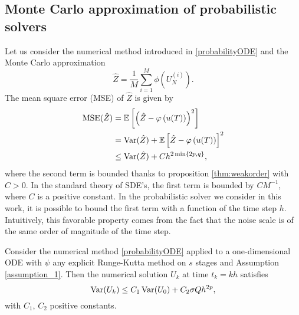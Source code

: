 \subsection{Monte Carlo approximation of probabilistic solvers}
Let us consider the numerical method introduced in \eqref{probabilityODE} and the Monte Carlo approximation 
\begin{equation}\label{eq:MCapproximation}
	\hat Z = \frac{1}{M} \sum_{i = 1}^M \phi\left(U_N^{(i)}\right).
\end{equation}
The mean square error (MSE) of $\hat Z$ is given by
\begin{equation}\label{eq:MCMSE}
\begin{aligned}
\operatorname{MSE}(\hat Z) &= \mathbb{E}\left[\left(\hat Z - \varphi\left(u(T)\right)\right)^2\right] \\
&= \operatorname{Var}(\hat Z) + \mathbb{E}\left[\hat Z - \varphi\left(u(T)\right)\right]^2 \\
&\leq \operatorname{Var}(\hat Z) + C h^{2\min\{2p, q\}},
\end{aligned}
\end{equation} 
where the second term is bounded thanks to proposition \ref{thm:weakorder} with $C > 0$. In the standard theory of SDE's, the first term is bounded by $CM^{-1}$, where $C$ is a positive constant. In the probabilistic solver we consider in this work, it is possible to bound the first term with a function of the time step $h$. Intuitively, this favorable property comes from the fact that the noise scale is of the same order of magnitude of the time step. 
\begin{lemma}\label{lem:varMC} Consider the numerical method \eqref{probabilityODE} applied to a one-dimensional ODE with $\psi$ any explicit Runge-Kutta method on $s$ stages and Assumption \ref{assumption_1}. Then the numerical solution $U_k$ at time $t_k = kh$ satisfies
\begin{equation}
	\operatorname{Var}(U_k) \leq C_1\operatorname{Var}(U_0) + C_2\sigma Q h^{2p},
\end{equation}
with $C_1$, $C_2$ positive constants.
\end{lemma}
